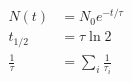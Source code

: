 

\vspace*{\fill}
\centering

\begin{align*}
    N(t) &= N_0 e^{-t/\tau} \\
    t_{1/2} &= \tau\ln{2} \\
    \frac{1}{\tau} &= \sum_{i} \frac{1}{\tau_{i}}
\end{align*}

\centering
\vspace*{\fill}

